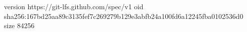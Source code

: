 version https://git-lfs.github.com/spec/v1
oid sha256:167bd25aa89c3135fef7c269279b129e3abfb24a100fd6a12245fba0102536d0
size 84256
